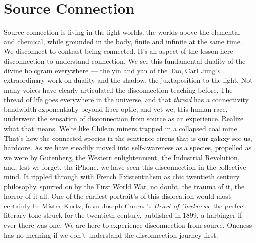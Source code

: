 \documentclass[letterpaper,9pt,twoside,titlepage,onecolumn,openany]{book}
\begin{document}
\section*{Source Connection}\label{source-connection}

Source connection is living in the light worlds, the worlds above the
elemental and chemical, while grounded in the body, finite and infinite
at the same time. We disconnect to contrast being connected. It's an
aspect of the lesson here --- disconnection to understand connection. We
see this fundamental duality of the divine hologram everywhere --- the
yin and yan of the Tao, Carl Jung's extraordinary work on duality and
the shadow, the juxtaposition to the light. Not many voices have clearly
articulated the disconnection teaching before. The thread of life goes
everywhere in the universe, and that \emph{thread} has a connectivity
bandwidth exponentially beyond fiber optic, and yet we, this human race,
underwent the sensation of disconnection from source as an experience.
Realize what that means. We're like Chilean miners trapped in a
collapsed coal mine. That's how the connected species in the sentience
circus that is our galaxy see us, hardcore. As we have steadily moved
into self-awareness as a species, propelled as we were by Gutenberg, the
Western enlightenment, the Industrial Revolution, and, lest we forget,
the iPhone, we have seen this disconnection in the collective mind. It
rippled through with French Existentialism as chic twentieth century
philosophy, spurred on by the First World War, no doubt, the trauma of
it, the horror of it all. One of the earliest portrait's of this
dislocation would most certainly be Mister Kurtz, from Joseph Conrad's
\emph{Heart of Darkness}, the perfect literary tone struck for the
twentieth century, published in 1899, a harbinger if ever there was one.
We are here to experience disconnection from source. Oneness has no
meaning if we don't understand the disconnection journey first.
\end{document}
